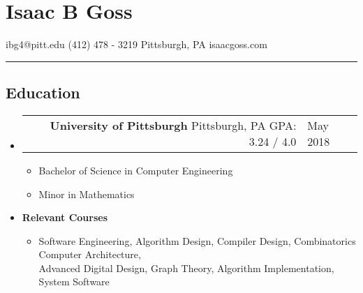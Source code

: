 \documentclass[18pt]{article}
\makeatletter
\providecommand{\tightlist}{
    \setlength{\itemsep}{0pt}\setlength{\parskip}{0pt}
}
\providecommand{\datetable}[2]{
    \begin{tabular*}{\textwidth}{@{}r @{\extracolsep{\fill}} l}
        #1 & #2
    \end{tabular*}
}
\makeatother
\begin{document}
  \section*{Isaac B Goss}\label{isaac-b-goss}
    ibg4@pitt.edu \textbar{} (412) 478 - 3219 \textbar{} Pittsburgh, PA \textbar{} isaacgoss.com
    
    \hrule
    
    \subsection*{Education}\label{education}      
        \begin{itemize}[label={}]
        \item \datetable{
            \textbf{University of Pittsburgh} \textbar{} 
            Pittsburgh, PA \textbar{} 
            GPA: 3.24 / 4.0
        }{
            May 2018
        }
        \begin{itemize}[ topsep=0pt]\tightlist
          \item Bachelor of Science in Computer Engineering
          \item Minor in Mathematics
        \end{itemize}
        \item \textbf{Relevant Courses}
            \begin{itemize}[label={}, topsep=0pt]
                \item
                Software Engineering,
                Algorithm Design,
                Compiler Design,
                Combinatorics
                Computer Architecture,\\
                Advanced Digital Design,
                Graph Theory,
                Algorithm Implementation,
                System Software
            \end{itemize}
        \end{itemize}
    
      
\end{document}
